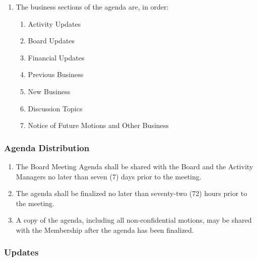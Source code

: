 \begin{enumerate}
 \item
  The business sections of the agenda are, in order:

  \begin{enumerate}
   \item
    Activity Updates
   \item
    Board Updates
   \item
    Financial Updates
   \item
    Previous Business
   \item
    New Business
   \item
    Discussion Topics
   \item
    Notice of Future Motions and Other Business
  \end{enumerate}

\end{enumerate}

\subsubsection{Agenda Distribution}
\label{agenda-distribution}

\begin{enumerate}
 \item
  The Board Meeting Agenda shall be shared with the Board and the Activity Managers no later than seven (7) days prior to the meeting.
 \item
  The agenda shall be finalized no later than seventy-two (72) hours prior to the meeting.
 \item
  A copy of the agenda, including all non-confidential motions, may be shared with the Membership after the agenda has been finalized.
\end{enumerate}

\subsubsection{Updates}
\label{board-meeting-updates}

